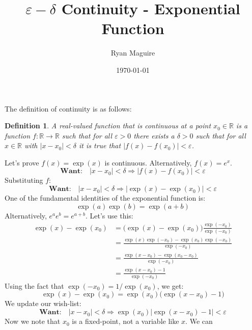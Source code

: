 \documentclass{article}
\title{$\varepsilon-\delta$ Continuity - Exponential Function}
\author{Ryan Maguire}
\date{\today}
\theoremstyle{normal}
\newtheorem{definition}{Definition}
\begin{document}
    \maketitle
    The definition of continuity is as follows:
    \begin{definition}
        A real-valued function that is continuous at a point
        $x_{0}\in\mathbb{R}$ is a function $f:\mathbb{R}\rightarrow\mathbb{R}$
        such that for all $\varepsilon>0$ there exists a $\delta>0$ such that
        for all $x\in\mathbb{R}$ with $|x-x_{0}|<\delta$ it is true that
        $|f(x)-f(x_{0})|<\varepsilon$.
    \end{definition}
    Let's prove $f(x)=\exp(x)$ is continuous. Alternatively, $f(x)=e^{x}$.
    \begin{equation}
        \textbf{Want:}\quad
        |x-x_{0}|<\delta
        \Rightarrow|f(x)-f(x_{0})|<\varepsilon
    \end{equation}
    Substituting $f$:
    \begin{equation}
        \textbf{Want:}\quad
        |x-x_{0}|<\delta
        \Rightarrow
        |\exp(x)-\exp(x_{0})|<\varepsilon
    \end{equation}
    One of the fundamental identities of the exponential function is:
    \begin{equation}
        \exp(a)\exp(b)=\exp(a+b)
    \end{equation}
    Alternatively, $e^{a}e^{b}=e^{a+b}$. Let's use this:
    \begin{align}
        \exp(x)-\exp(x_{0})
            &=\big(\exp(x)-\exp(x_{0})\big)\frac{\exp(-x_{0})}{\exp(-x_{0})}\\
            &=\frac{\exp(x)\exp(-x_{0})-\exp(x_{0})\exp(-x_{0})}{\exp(-x_{0})}\\
            &=\frac{\exp(x-x_{0})-\exp(x_{0}-x_{0})}{\exp(-x_{0})}\\
            &=\frac{\exp(x-x_{0})-1}{\exp(-x_{0})}
    \end{align}
    Using the fact that $\exp(-x_{0})=1/\exp(x_{0})$, we get:
    \begin{equation}
        \exp(x)-\exp(x_{0})
        =\exp(x_{0})\big(\exp(x-x_{0})-1\big)
    \end{equation}
    We update our wish-list:
    \begin{equation}
        \textbf{Want:}\quad
        |x-x_{0}|<\delta
        \Rightarrow
        \exp(x_{0})\big|\exp(x-x_{0})-1\big|<\varepsilon
    \end{equation}
    Now we note that $x_{0}$ is a fixed-point, not a variable like $x$. We can
\end{document}
